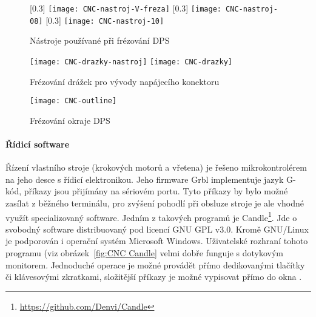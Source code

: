\begin{figure}[htbp]
    \centering
    [0.3\textwidth]{%
        \texttt{[image: CNC-nastroj-V-freza]}
    }
    [0.3\textwidth]{%
        \texttt{[image: CNC-nastroj-08]}
    }
    [0.3\textwidth]{%
        \texttt{[image: CNC-nastroj-10]}
    }
    \caption{Nástroje používané při frézování DPS}
    \label{fig:CNC nastroje}
\end{figure}

\begin{figure}[htbp]
    \centering
    \texttt{[image: CNC-drazky-nastroj]}
    \hfill
    \texttt{[image: CNC-drazky]}
    \caption{Frézování drážek pro vývody napájecího konektoru}
    \label{fig:CNC drazky}
\end{figure}

\begin{figure}[htbp]
    \centering
    \texttt{[image: CNC-outline]}
    \caption{Frézování okraje DPS}
    \label{fig:CNC outline}
\end{figure}


\paragraph{Řídicí software}
Řízení vlastního stroje (krokových motorů a vřetena) je řešeno mikrokontrolérem
na jeho desce s řídicí elektronikou. Jeho firmware Grbl implementuje jazyk
G-kód, příkazy jsou přijímány na sériovém portu. Tyto příkazy by bylo možné
zasílat z běžného terminálu, pro zvýšení pohodlí při obsluze stroje je ale
vhodné využít specializovaný software. Jedním z takových programů je
Candle\footnote{\url{https://github.com/Denvi/Candle}}. Jde o svobodný software
distribuovaný pod licencí GNU GPL v3.0. Kromě GNU/Linux je podporován
i operační systém Microsoft Windows. Uživatelské rozhraní tohoto programu (viz
obrázek~\vref{fig:CNC Candle} velmi dobře funguje s dotykovým monitorem.
Jednoduché operace je možné provádět přímo dedikovanými tlačítky či klávesovými
zkratkami, složitější příkazy je možné vypisovat přímo do okna .


